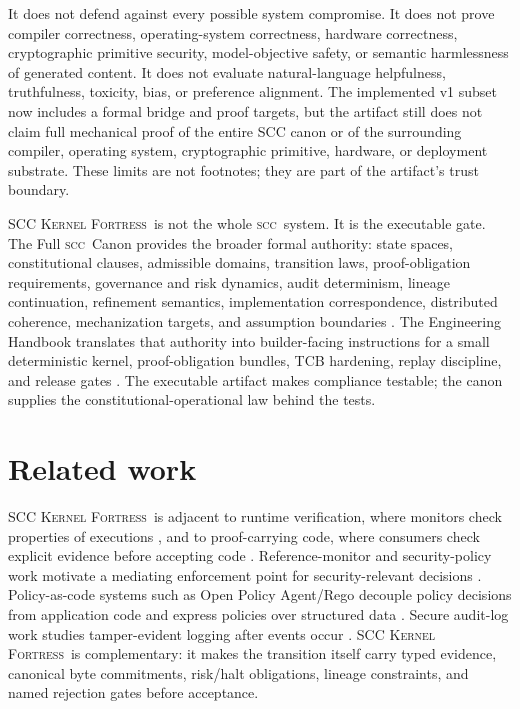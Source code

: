 \documentclass{article}
\newcommand{\SCC}{\textsc{scc}}
\newcommand{\KF}{\textsc{SCC Kernel Fortress}}
\begin{document}
It does not defend against every possible system compromise. It does not prove compiler correctness, operating-system correctness, hardware correctness, cryptographic primitive security, model-objective safety, or semantic harmlessness of generated content. It does not evaluate natural-language helpfulness, truthfulness, toxicity, bias, or preference alignment. The implemented v1 subset now includes a formal bridge and proof targets, but the artifact still does not claim full mechanical proof of the entire SCC canon or of the surrounding compiler, operating system, cryptographic primitive, hardware, or deployment substrate. These limits are not footnotes; they are part of the artifact's trust boundary.

\KF\ is not the whole \SCC\ system. It is the executable gate. The Full \SCC\ Canon provides the broader formal authority: state spaces, constitutional clauses, admissible domains, transition laws, proof-obligation requirements, governance and risk dynamics, audit determinism, lineage continuation, refinement semantics, implementation correspondence, distributed coherence, mechanization targets, and assumption boundaries \citep{scc-canon}. The Engineering Handbook translates that authority into builder-facing instructions for a small deterministic kernel, proof-obligation bundles, TCB hardening, replay discipline, and release gates \citep{scc-handbook}. The executable artifact makes compliance testable; the canon supplies the constitutional-operational law behind the tests.

\section{Related work}
\KF\ is adjacent to runtime verification, where monitors check properties of executions \citep{leucker2009runtime,havelund2004monitoring}, and to proof-carrying code, where consumers check explicit evidence before accepting code \citep{necula1997pcc}. Reference-monitor and security-policy work motivate a mediating enforcement point for security-relevant decisions \citep{anderson1972reference,schneider2000enforceable}. Policy-as-code systems such as Open Policy Agent/Rego decouple policy decisions from application code and express policies over structured data \citep{opa2026rego}. Secure audit-log work studies tamper-evident logging after events occur \citep{schneier1999audit}. \KF\ is complementary: it makes the transition itself carry typed evidence, canonical byte commitments, risk/halt obligations, lineage constraints, and named rejection gates before acceptance.
\end{document}
